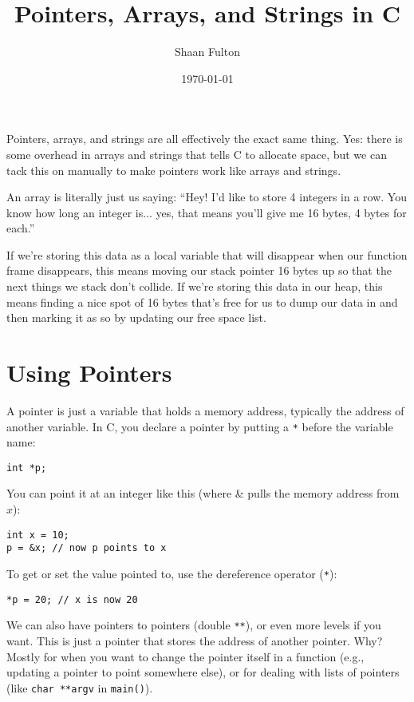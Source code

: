 \documentclass[12pt]{article}
\title{Pointers, Arrays, and Strings in C}
\author{Shaan Fulton}
\date{\today}
\begin{document}
\maketitle

Pointers, arrays, and strings are all effectively the exact same thing. Yes: there is some overhead in arrays and strings that tells C to allocate space, but we can tack this on manually to make pointers work like arrays and strings.

An array is literally just us saying: ``Hey! I'd like to store 4 integers in a row. You know how long an integer is... yes, that means you'll give me 16 bytes, 4 bytes for each.''

If we're storing this data as a local variable that will disappear when our function frame disappears, this means moving our stack pointer 16 bytes up so that the next things we stack don't collide. If we're storing this data in our heap, this means finding a nice spot of 16 bytes that's free for us to dump our data in and then marking it as so by updating our free space list.

\section*{Using Pointers}

A pointer is just a variable that holds a memory address, typically the address of another variable. In C, you declare a pointer by putting a \texttt{*} before the variable name:

\begin{verbatim}
int *p;
\end{verbatim}

You can point it at an integer like this (where \& pulls the memory address from $x$):

\begin{verbatim}
int x = 10;
p = &x; // now p points to x
\end{verbatim}

To get or set the value pointed to, use the dereference operator (\texttt{*}):

\begin{verbatim}
*p = 20; // x is now 20
\end{verbatim}

We can also have pointers to pointers (double \texttt{**}), or even more levels if you want. This is just a pointer that stores the address of another pointer. Why? Mostly for when you want to change the pointer itself in a function (e.g., updating a pointer to point somewhere else), or for dealing with lists of pointers (like \texttt{char **argv} in \texttt{main()}).
\end{document}
